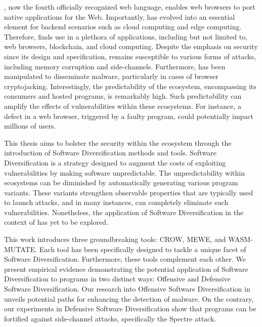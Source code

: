 \Wasm, now the fourth officially recognized web language, enables web browsers to port native applications for the Web. 
Importantly, \Wasm has evolved into an essential element for backend scenarios such as cloud computing and edge computing. 
Therefore, \Wasm finds use in a plethora of applications, including but not limited to, web browsers, blockchain, and cloud computing. 
Despite the emphasis on security since its design and specification, \Wasm remains susceptible to various forms of attacks, including memory corruption and side-channels. 
Furthermore, \Wasm has been manipulated to disseminate malware, particularly in cases of browser cryptojacking. 
Interestingly, the predictability of the \Wasm ecosystem, encompassing its consumers and hosted programs, is remarkably high. 
Such predictability can amplify the effects of vulnerabilities within these ecosystems. 
For instance, a defect in a web browser, triggered by a faulty \Wasm program, could potentially impact millions of users. 

This thesis aims to bolster the security within the \Wasm ecosystem through the introduction of Software Diversification methods and tools. 
Software Diversification is a strategy designed to augment the costs of exploiting vulnerabilities by making software unpredictable.
The unpredictability within ecosystems can be diminished by automatically generating various program variants. 
These variants strengthen observable properties that are typically used to launch attacks, and in many instances, can completely eliminate such vulnerabilities. 
Nonetheless, the application of Software Diversification in the context of \Wasm has yet to be explored.


This work introduces three groundbreaking tools: CROW, MEWE, and WASM-MUTATE. 
Each tool has been specifically designed to tackle a unique facet of Software Diversification. 
Furthermore, these tools complement each other. 
We present empirical evidence demonstrating the potential application of Software Diversification to \Wasm programs in two distinct ways: Offensive and Defensive Software Diversification. 
Our research into Offensive Software Diversification in \Wasm unveils potential paths for enhancing the detection of \Wasm malware. 
On the contrary, our experiments in Defensive Software Diversification show that \Wasm programs can be fortified against side-channel attacks, specifically the Spectre attack.


